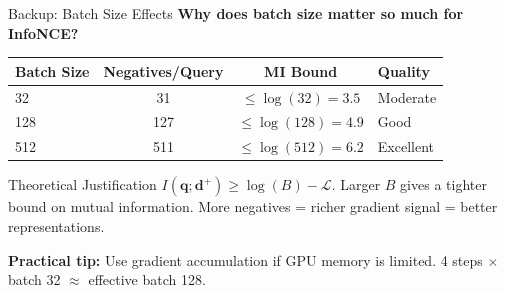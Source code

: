 \documentclass[aspectratio=169]{beamer}
\newcommand{\vq}{\mathbf{q}}
\newcommand{\vd}{\mathbf{d}}
\begin{document}
\begin{frame}{Backup: Batch Size Effects}
\textbf{Why does batch size matter so much for InfoNCE?}

\vspace{0.5em}

\begin{table}
\centering
\begin{tabular}{lccl}
\toprule
\textbf{Batch Size} & \textbf{Negatives/Query} & \textbf{MI Bound} & \textbf{Quality} \\
\midrule
32 & 31 & $\leq \log(32) = 3.5$ & Moderate \\
128 & 127 & $\leq \log(128) = 4.9$ & Good \\
512 & 511 & $\leq \log(512) = 6.2$ & Excellent \\
\bottomrule
\end{tabular}
\end{table}

\vspace{0.5em}

\begin{block}{Theoretical Justification}
$I(\vq; \vd^+) \geq \log(B) - \mathcal{L}$. Larger $B$ gives a tighter bound on mutual information. More negatives = richer gradient signal = better representations.
\end{block}

\vspace{0.5em}

\textbf{Practical tip:} Use gradient accumulation if GPU memory is limited. 4 steps $\times$ batch 32 $\approx$ effective batch 128.
\end{frame}
\end{document}
